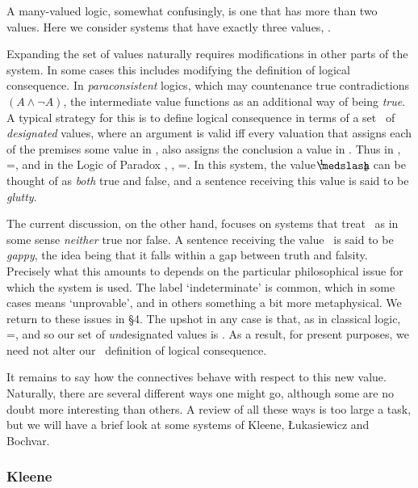 	A many-valued logic, somewhat confusingly, is one that has more than two values. Here we consider systems that have exactly three values, .
	
	Expanding the set of values naturally requires modifications in other parts of the system. In some cases this includes modifying the definition of logical consequence. In \emph{paraconsistent} logics, which may countenance true contradictions $(A \wedge \neg A)$, the intermediate value functions as an additional way of being \emph{true}. A typical strategy for this is to define logical consequence in terms of a set \DesValues\ of \emph{designated} values, where an argument is valid iff every valuation that assigns each of the premises some value in \DesValues, also assigns the conclusion a value in \DesValues. Thus in \CPL, \DesValues=, and in the Logic of Paradox \cite{Priest1979}, \LP, \DesValues=. In this system, the value $\oneHalf$ can be thought of as \emph{both} true and false, and a sentence receiving this value is said to be \emph{glutty}.
	
	The current discussion, on the other hand, focuses on systems that treat \oneHalf\ as in some sense \emph{neither} true nor false. A sentence receiving the value \oneHalf\ is said to be \emph{gappy}, the idea being that it falls within a gap between truth and falsity. Precisely what this amounts to depends on the particular philosophical issue for which the system is used. The label `indeterminate' is common, which in some cases means `unprovable', and in others something a bit more metaphysical. We return to these issues in \S 4. The upshot in any case is that, as in classical logic, \DesValues=, and so our set of \emph{un}designated values is . As a result, for present purposes, we need not alter our \CPL\ definition of logical consequence. 
	
	It remains to say how the connectives behave with respect to this new value. Naturally, there are several different ways one might go, although some are no doubt more interesting than others. A review of all these ways is too large a task, but we will have a brief look at some systems of Kleene, \L ukasiewicz and Bochvar.
	
	\subsubsection{Kleene}\label{kleene}
	
